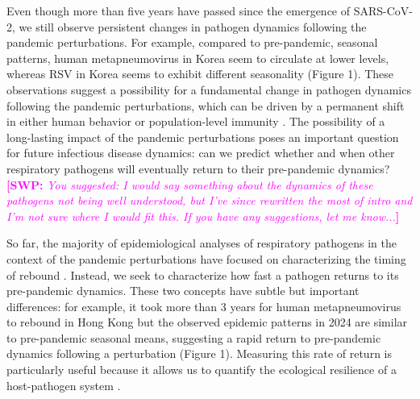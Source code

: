 \documentclass[12pt]{article}
\newcommand{\comment}{\showcomment}
\newcommand{\showcomment}[3]{\textcolor{#1}{\textbf{[#2: }\textsl{#3}\textbf{]}}}
\newcommand{\swp}[1]{\comment{magenta}{SWP}{#1}}
\begin{document}
Even though more than five years have passed since the emergence of SARS-CoV-2, we still observe persistent changes in pathogen dynamics following the pandemic perturbations.
For example, compared to pre-pandemic, seasonal patterns, human metapneumovirus in Korea seem to circulate at lower levels, whereas RSV in Korea seems to exhibit different seasonality (Figure 1).
These observations suggest a possibility for a fundamental change in pathogen dynamics following the pandemic perturbations, which can be driven by a permanent shift in either human behavior or population-level immunity \citep{kissler2020projecting,baker2022long}.
The possibility of a long-lasting impact of the pandemic perturbations poses an important question for future infectious disease dynamics: can we predict whether and when other respiratory pathogens will eventually return to their pre-pandemic dynamics?
\swp{You suggested: I would say something about the dynamics of these pathogens not being well understood, but I've since rewritten the most of intro and I'm not sure where I would fit this. If you have any suggestions, let me know...}

So far, the majority of epidemiological analyses of respiratory pathogens in the context of the pandemic perturbations have focused on characterizing the timing of rebound \citep{baker2020impact,eden2022off,perofsky2024impacts}.
Instead, we seek to characterize how fast a pathogen returns to its pre-pandemic dynamics.
These two concepts have subtle but important differences: 
for example, it took more than 3 years for human metapneumovirus to rebound in Hong Kong but the observed epidemic patterns in 2024 are similar to pre-pandemic seasonal means, suggesting a rapid return to pre-pandemic dynamics following a perturbation (Figure 1).
Measuring this rate of return is particularly useful because it allows us to quantify the ecological resilience of a host-pathogen system \citep{pimm1979structure, neubert1997alternatives,gunderson2000ecological,dakos2022ecological}.
\end{document}
